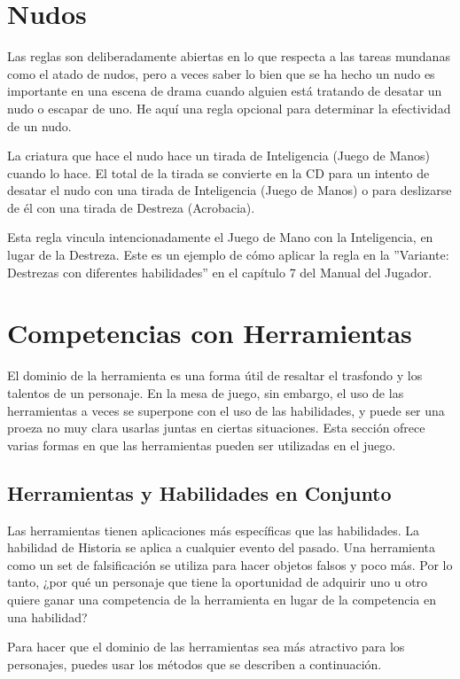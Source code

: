 \documentclass[a4paper,twocolumn,openany,10pt]{dndbook}
\begin{document}
\section{Nudos}
Las reglas son deliberadamente abiertas en lo que respecta a las tareas mundanas como el atado de nudos, pero a veces saber lo
bien que se ha hecho un nudo es importante en una escena de drama cuando alguien está tratando de desatar un nudo o escapar de
uno. He aquí una regla opcional para determinar la efectividad de un nudo.

La criatura que hace el nudo hace un tirada de Inteligencia (Juego de Manos) cuando lo hace. El total de la tirada se convierte en
la CD para un intento de desatar el nudo con una tirada de Inteligencia (Juego de Manos) o para deslizarse de él con una tirada de
Destreza (Acrobacia).

Esta regla vincula intencionadamente el Juego de Mano con la Inteligencia, en lugar de la Destreza. Este es un ejemplo de cómo
aplicar la regla en la ''Variante: Destrezas con diferentes habilidades'' en el capítulo 7 del Manual del Jugador. 

\section{Competencias con Herramientas}
El dominio de la herramienta es una forma útil de resaltar el trasfondo y los talentos de un personaje. En la mesa de juego, sin
embargo, el uso de las herramientas a veces se superpone con el uso de las habilidades, y puede ser una proeza no muy clara
usarlas juntas en ciertas situaciones. Esta sección ofrece varias formas en que las herramientas pueden ser utilizadas en el
juego.

\subsection{Herramientas y Habilidades en Conjunto}
Las herramientas tienen aplicaciones más específicas que las habilidades. La habilidad de Historia se aplica a cualquier evento
del pasado. Una herramienta como un set de falsificación se utiliza para hacer objetos falsos y poco más. Por lo tanto, ¿por qué
un personaje que tiene la oportunidad de adquirir uno u otro quiere ganar una competencia de la herramienta en lugar de la
competencia en una habilidad?

Para hacer que el dominio de las herramientas sea más atractivo para los personajes, puedes usar los métodos que se describen a
continuación.
\end{document}
